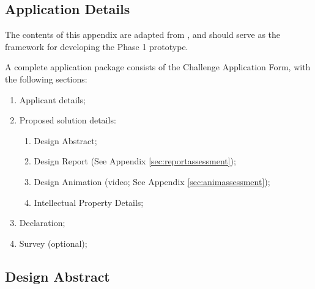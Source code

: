 \documentclass{report}
\begin{document}
\begin{appendices}
\newpage

\section{Application Details}
\label{sec:application}

The contents of this appendix are adapted from \cite{applicantguide}, and should serve as the framework 
for developing the Phase 1 prototype.

A complete application package consists of the Challenge Application Form, with the following sections:

\begin{enumerate}
    \item Applicant details;
    \item Proposed solution details:
    \begin{enumerate}
        \item Design Abstract;
        \item Design Report (See Appendix \ref{sec:reportassessment});
        \item Design Animation (video; See Appendix \ref{sec:animassessment});
        \item Intellectual Property Details;
    \end{enumerate}
    \item Declaration;
    \item Survey (optional);
\end{enumerate}

\subsection{Design Abstract}



\end{appendices}

\newpage




\end{document}
